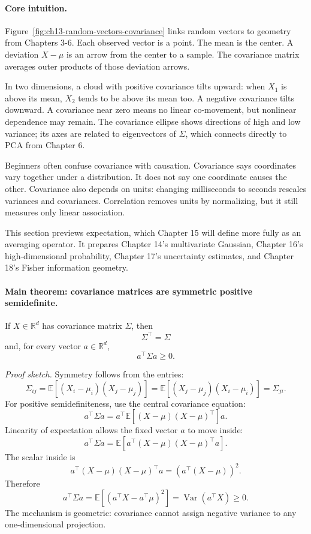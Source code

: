 \paragraph{Core intuition.}
Figure~\ref{fig:ch13-random-vectors-covariance} links random vectors to geometry from Chapters 3-6. Each observed vector is a point. The mean is the center. A deviation \(X-\mu\) is an arrow from the center to a sample. The covariance matrix averages outer products of those deviation arrows.

In two dimensions, a cloud with positive covariance tilts upward: when \(X_1\) is above its mean, \(X_2\) tends to be above its mean too. A negative covariance tilts downward. A covariance near zero means no linear co-movement, but nonlinear dependence may remain. The covariance ellipse shows directions of high and low variance; its axes are related to eigenvectors of \(\Sigma\), which connects directly to PCA from Chapter 6.

Beginners often confuse covariance with causation. Covariance says coordinates vary together under a distribution. It does not say one coordinate causes the other. Covariance also depends on units: changing milliseconds to seconds rescales variances and covariances. Correlation removes units by normalizing, but it still measures only linear association.

This section previews expectation, which Chapter 15 will define more fully as an averaging operator. It prepares Chapter 14's multivariate Gaussian, Chapter 16's high-dimensional probability, Chapter 17's uncertainty estimates, and Chapter 18's Fisher information geometry.

\paragraph{Main theorem: covariance matrices are symmetric positive semidefinite.}
If \(X\in\mathbb{R}^d\) has covariance matrix \(\Sigma\), then
\[
\Sigma^\top=\Sigma
\]
and, for every vector \(a\in\mathbb{R}^d\),
\[
a^\top\Sigma a\geq0.
\]

\emph{Proof sketch.}
Symmetry follows from the entries:
\[
\Sigma_{ij}
=\mathbb{E}[(X_i-\mu_i)(X_j-\mu_j)]
=\mathbb{E}[(X_j-\mu_j)(X_i-\mu_i)]
=\Sigma_{ji}.
\]
For positive semidefiniteness, use the central covariance equation:
\[
a^\top\Sigma a
=
a^\top\mathbb{E}[(X-\mu)(X-\mu)^\top]a.
\]
Linearity of expectation allows the fixed vector \(a\) to move inside:
\[
a^\top\Sigma a
=
\mathbb{E}\!\left[a^\top(X-\mu)(X-\mu)^\top a\right].
\]
The scalar inside is
\[
a^\top(X-\mu)(X-\mu)^\top a
=
\left(a^\top(X-\mu)\right)^2.
\]
Therefore
\[
a^\top\Sigma a
=
\mathbb{E}\!\left[\left(a^\top X-a^\top\mu\right)^2\right]
=
\operatorname{Var}(a^\top X)\geq0.
\]
The mechanism is geometric: covariance cannot assign negative variance to any one-dimensional projection.

